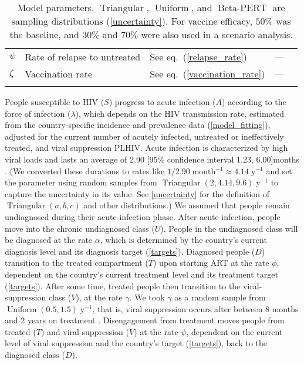 \documentclass{article}
\DeclareMathOperator{\Uniform}{Uniform}
\DeclareMathOperator{\Triangular}{Triangular}
\DeclareMathOperator{\BetaPERT}{Beta-PERT}
\begin{document}
\begin{table}
\begin{center}
\begin{tabularx}{\textwidth}{lXlll}
      $\psi$ & Rate of relapse to untreated & See eq.~(\ref{relapse_rate})
      & --- \\
      $\zeta$ & Vaccination rate & See eq.~(\ref{vaccination_rate}) & --- \\
      \hline
      \vspace*{-2.5em}
    \end{tabularx}
    \caption{Model parameters. $\Triangular$, $\Uniform$, and
      $\BetaPERT$ are sampling distributions (\autoref{uncertainty}).
      For vaccine efficacy, $50\%$ was the baseline, and $30\%$ and
      $70\%$ were also used in a scenario analysis.}
    \label{model_param}
  \end{center}
\end{table}

People susceptible to HIV ($S$) progress to acute infection ($A$)
according to the force of infection ($\lambda$), which depends on the
HIV transmission rate, estimated from the country-specific incidence
and prevalence data (\autoref{model_fitting}), adjusted for the
current number of acutely infected, untreated or ineffectively
treated, and viral suppression PLHIV.  Acute infection is
characterized by high viral loads and lasts an average of 2.90 [95\%
confidence interval 1.23, 6.00]\;months
\autocite{Hollingsworth2008-iy}.  (We converted these durations to
rates like $1 / 2.90\;\text{month$^{-1}$} \approx
4.14\;\text{y$^{-1}$}$ and set the parameter using random samples from
$\Triangular(2, 4.14, 9.6)\;\text{y$^{-1}$}$ to capture the
uncertainty in its value.  See \autoref{uncertainty} for the
definition of $\Triangular(a, b, c)$ and other distributions.)  We
assumed that people remain undiagnosed during their acute-infection
phase. After acute infection, people move into the chronic undiagnosed
class ($U$).  People in the undiagnosed class will be diagnosed at the
rate $\alpha$, which is determined by the country's current diagnosis
level and its diagnosis target (\autoref{targets}).  Diagnosed people
($D$) transition to the treated compartment ($T$) upon starting ART at
the rate $\phi$, dependent on the country's current treatment level
and its treatment target (\autoref{targets}).  After some time,
treated people then transition to the viral-suppression class ($V$),
at the rate $\gamma$.  We took $\gamma$ as a random sample from
$\Uniform(0.5, 1.5)\;\text{y$^{-1}$}$, that is, viral suppression
occurs after between 8 months and 2 years on treatment
\autocite{Currie2009-yz}.  Disengagement from treatment moves people
from treated ($T$) and viral suppression ($V$) at the rate $\psi$,
dependent on the current level of viral suppression and the country's
target (\autoref{targets}), back to the diagnosed class ($D$).
\end{document}
